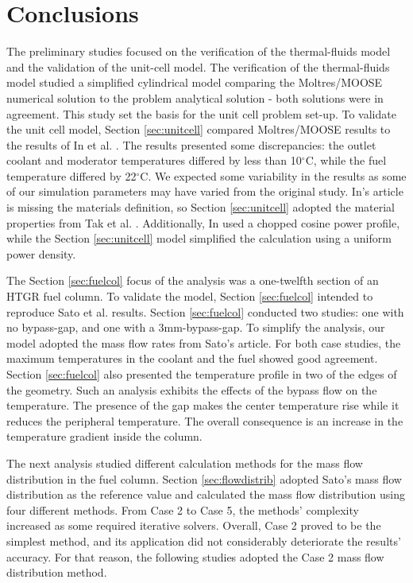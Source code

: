 \section{Conclusions}
\label{sec:thermal-conc}

The preliminary studies focused on the verification of the thermal-fluids model and the validation of the unit-cell model.
The verification of the thermal-fluids model studied a simplified cylindrical model comparing the Moltres/MOOSE numerical solution to the problem analytical solution - both solutions were in agreement.
This study set the basis for the unit cell problem set-up.
To validate the unit cell model, Section \ref{sec:unitcell} compared Moltres/MOOSE results to the results of In et al. \cite{in_three-dimensional_2006}.
The results presented some discrepancies: the outlet coolant and moderator temperatures differed by less than 10$^{\circ}$C, while the fuel temperature differed by 22$^{\circ}$C.
We expected some variability in the results as some of our simulation parameters may have varied from the original study.
In's article is missing the materials definition, so Section \ref{sec:unitcell} adopted the material properties from Tak et al. \cite{tak_numerical_2008}.
Additionally, In used a chopped cosine power profile, while the Section \ref{sec:unitcell} model simplified the calculation using a uniform power density.

The Section \ref{sec:fuelcol} focus of the analysis was a one-twelfth section of an HTGR fuel column.
To validate the model, Section \ref{sec:fuelcol} intended to reproduce Sato et al. \cite{sato_computational_2010} results.
Section \ref{sec:fuelcol} conducted two studies: one with no bypass-gap, and one with a 3mm-bypass-gap.
To simplify the analysis, our model adopted the mass flow rates from Sato's article.
For both case studies, the maximum temperatures in the coolant and the fuel showed good agreement.
Section \ref{sec:fuelcol} also presented the temperature profile in two of the edges of the geometry.
Such an analysis exhibits the effects of the bypass flow on the temperature.
The presence of the gap makes the center temperature rise while it reduces the peripheral temperature.
The overall consequence is an increase in the temperature gradient inside the column.

The next analysis studied different calculation methods for the mass flow distribution in the fuel column.
Section \ref{sec:flowdistrib} adopted Sato's mass flow distribution as the reference value and calculated the mass flow distribution using four different methods.
From Case 2 to Case 5, the methods' complexity increased as some required iterative solvers.
Overall, Case 2 proved to be the simplest method, and its application did not considerably deteriorate the results' accuracy.
For that reason, the following studies adopted the Case 2 mass flow distribution method.

